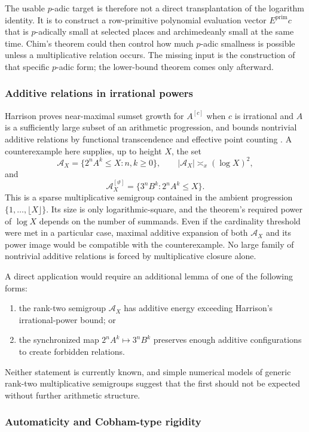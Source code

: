 \documentclass[11pt,oneside]{article}
\theoremstyle{definition}
\theoremstyle{remark}
\newcommand{\thetaq}{\vartheta}
\begin{document}
The usable $p$-adic target is therefore not a direct transplantation of the logarithm
identity.  It is to construct a row-primitive polynomial evaluation vector
$E^{\mathrm{prim}}c$ that is $p$-adically small at selected places and archimedeanly small at
the same time.  Chim's theorem could then control how much $p$-adic smallness is possible
unless a multiplicative relation occurs.  The missing input is the construction of that
specific $p$-adic form; the lower-bound theorem comes only afterward.

\subsubsection{Additive relations in irrational powers}

Harrison proves near-maximal sumset growth for $A^{[c]}$ when $c$ is irrational and $A$ is a
sufficiently large subset of an arithmetic progression, and bounds nontrivial additive
relations by functional transcendence and effective point counting \cite{Harrison2026}.  A
counterexample here supplies, up to height $X$, the set
\[
  \mathcal A_X=\{2^nA^k\le X:n,k\ge0\},
  \qquad
  |\mathcal A_X|\asymp_x(\log X)^2,
\]
and
\[
  \mathcal A_X^{[\thetaq]}
   =\{3^nB^k:2^nA^k\le X\}.
\]
This is a sparse multiplicative semigroup contained in the ambient progression
$\{1,\dots,\lfloor X\rfloor\}$.  Its size is only logarithmic-square, and the theorem's
required power of $\log X$ depends on the number of summands.  Even if the cardinality
threshold were met in a particular case, maximal additive expansion of both
$\mathcal A_X$ and its power image would be compatible with the counterexample.  No large
family of nontrivial additive relations is forced by multiplicative closure alone.

A direct application would require an additional lemma of one of the following forms:
\begin{enumerate}
\item the rank-two semigroup $\mathcal A_X$ has additive energy exceeding Harrison's
irrational-power bound; or
\item the synchronized map $2^nA^k\mapsto3^nB^k$ preserves enough additive configurations to
create forbidden relations.
\end{enumerate}
Neither statement is currently known, and simple numerical models of generic rank-two
multiplicative semigroups suggest that the first should not be expected without further
arithmetic structure.

\subsubsection{Automaticity and Cobham-type rigidity}
\end{document}
